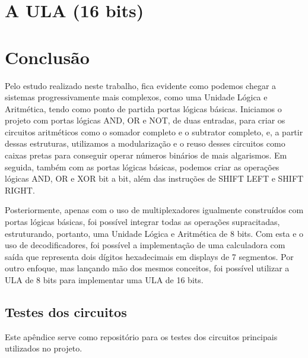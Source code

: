 \documentclass[
	12pt,				%
	openright,			%
	twoside,			%
	a4paper,			%
	english,			%
	french,				%
	spanish,			%
	brazil,				%
	]{abntex2}
\begin{document}
\chapter{A ULA (16 bits)}

\lipsum[13]

\chapter*[Conclusão]{Conclusão}

Pelo estudo realizado neste trabalho, fica evidente como podemos chegar a sistemas progressivamente mais complexos, como uma Unidade Lógica e Aritmética, tendo como ponto de partida portas lógicas básicas. Iniciamos o projeto com portas lógicas AND, OR e NOT, de duas entradas, para criar os circuitos aritméticos como o somador completo e o subtrator completo, e, a partir dessas estruturas, utilizamos a modularização e o reuso desses circuitos como caixas pretas para conseguir operar números binários de mais algarismos. Em seguida, também com as portas lógicas básicas, podemos criar as operações lógicas AND, OR e XOR bit a bit, além das instruções de SHIFT LEFT e SHIFT RIGHT.

Posteriormente, apenas com o uso de multiplexadores igualmente construídos com portas lógicas básicas, foi possível integrar todas as operações supracitadas, estruturando, portanto, uma Unidade Lógica e Aritmética de 8 bits. Com esta e o uso de decodificadores, foi possível a implementação de uma calculadora com saída que representa dois dígitos hexadecimais em displays de 7 segmentos. Por outro enfoque, mas lançando mão dos mesmos conceitos, foi possível utilizar a ULA de 8 bits para implementar uma ULA de 16 bits.

\begin{apendicesenv}

\chapter{Testes dos circuitos}\label{apendiceA}

Este apêndice serve como repositório para os testes dos circuitos principais utilizados no projeto.

\end{apendicesenv}
\end{document}
